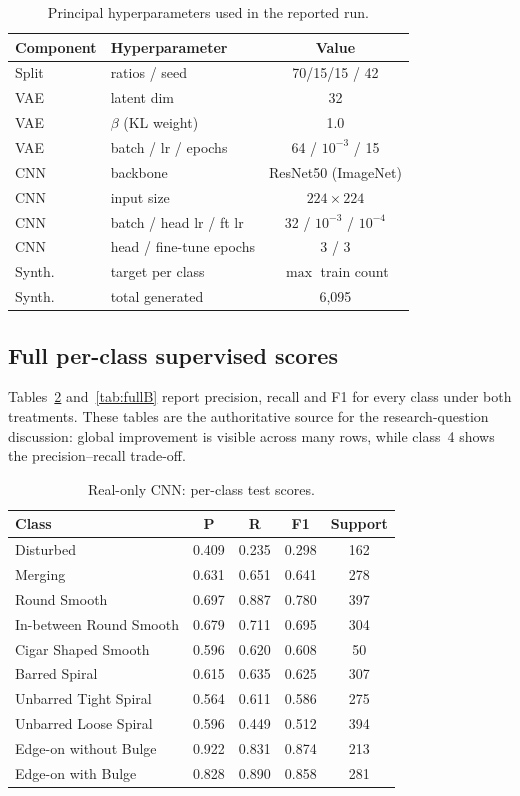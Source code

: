 \documentclass[conference]{IEEEtran}
\begin{document}
\begin{table}[t]
\caption{Principal hyperparameters used in the reported run.}
\label{tab:hparams}
\centering
\small
\begin{tabular}{llc}
\toprule
Component & Hyperparameter & Value \\
\midrule
Split & ratios / seed & 70/15/15 / 42 \\
VAE & latent dim & 32 \\
VAE & $\beta$ (KL weight) & 1.0 \\
VAE & batch / lr / epochs & 64 / $10^{-3}$ / 15 \\
CNN & backbone & ResNet50 (ImageNet) \\
CNN & input size & $224\times224$ \\
CNN & batch / head lr / ft lr & 32 / $10^{-3}$ / $10^{-4}$ \\
CNN & head / fine-tune epochs & 3 / 3 \\
Synth. & target per class & $\max$ train count \\
Synth. & total generated & 6{,}095 \\
\bottomrule
\end{tabular}
\end{table}

\subsection{Full per-class supervised scores}
Tables~\ref{tab:fullA} and~\ref{tab:fullB} report precision, recall and F1 for every class under both treatments. These tables are the authoritative source for the research-question discussion: global improvement is visible across many rows, while class~4 shows the precision--recall trade-off.

\begin{table}[t]
\caption{Real-only CNN: per-class test scores.}
\label{tab:fullA}
\centering
\scriptsize
\begin{tabular}{lcccc}
\toprule
Class & P & R & F1 & Support \\
\midrule
Disturbed & 0.409 & 0.235 & 0.298 & 162 \\
Merging & 0.631 & 0.651 & 0.641 & 278 \\
Round Smooth & 0.697 & 0.887 & 0.780 & 397 \\
In-between Round Smooth & 0.679 & 0.711 & 0.695 & 304 \\
Cigar Shaped Smooth & 0.596 & 0.620 & 0.608 & 50 \\
Barred Spiral & 0.615 & 0.635 & 0.625 & 307 \\
Unbarred Tight Spiral & 0.564 & 0.611 & 0.586 & 275 \\
Unbarred Loose Spiral & 0.596 & 0.449 & 0.512 & 394 \\
Edge-on without Bulge & 0.922 & 0.831 & 0.874 & 213 \\
Edge-on with Bulge & 0.828 & 0.890 & 0.858 & 281 \\
\bottomrule
\end{tabular}
\end{table}
\end{document}
